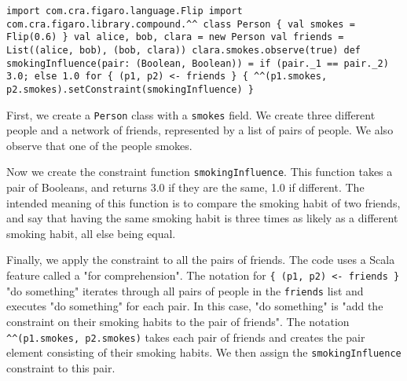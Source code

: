 \begin{flushleft}
\texttt{import com.cra.figaro.language.Flip
\newline import com.cra.figaro.library.compound.\textasciicircum \textasciicircum
\newline 
\newline class Person \{
\newline \tab val smokes = Flip(0.6) 
\newline \} 
\newline 
\newline val alice, bob, clara = new Person
\newline val friends = List((alice, bob), (bob, clara))
\newline clara.smokes.observe(true) 
\newline
{}
\newline def smokingInfluence(pair: (Boolean, Boolean)) = 
\newline \tab if (pair.\_1 == pair.\_2) 3.0; else 1.0
\newline
\newline for \{ (p1, p2) <- friends \} \{
\newline \tab \textasciicircum \textasciicircum(p1.smokes, p2.smokes).setConstraint(smokingInfluence)
\newline \} }  
\end{flushleft}

First, we create a \texttt{Person} class with a \texttt{smokes} field. We create three different people and a network of friends, represented by a list of pairs of people. We also observe that one of the people smokes.

Now we create the constraint function \texttt{smokingInfluence}. This function takes a pair of Booleans, and returns 3.0 if they are the same, 1.0 if different. The intended meaning of this function is to compare the smoking habit of two friends, and say that having the same smoking habit is three times as likely as a different smoking habit, all else being equal.

Finally, we apply the constraint to all the pairs of friends. The code uses a Scala feature called a "for comprehension". The notation for \texttt{\{ (p1, p2) <- friends \}} { "do something" } iterates through all pairs of people in the \texttt{friends} list and executes "do something" for each pair. In this case, "do something" is "add the constraint on their smoking habits to the pair of friends". The notation \texttt{\textasciicircum \textasciicircum(p1.smokes, p2.smokes)} takes each pair of friends and creates the pair element consisting of their smoking habits. We then assign the \texttt{smokingInfluence} constraint to this pair.


